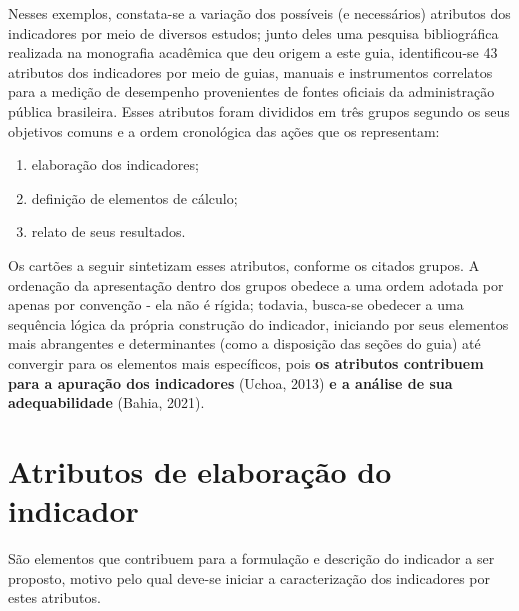 \documentclass[
  letterpaper,
  DIV=11,
  numbers=noendperiod]{scrreprt}
\begin{document}
Nesses exemplos, constata-se a variação dos possíveis (e necessários)
atributos dos indicadores por meio de diversos estudos; junto deles uma
pesquisa bibliográfica realizada na monografia acadêmica que deu origem
a este guia, identificou-se 43 atributos dos indicadores por meio de
guias, manuais e instrumentos correlatos para a medição de desempenho
provenientes de fontes oficiais da administração pública brasileira.
Esses atributos foram divididos em três grupos segundo os seus objetivos
comuns e a ordem cronológica das ações que os representam:

\begin{enumerate}
\def\labelenumi{\arabic{enumi}.}
\item
  elaboração dos indicadores;
\item
  definição de elementos de cálculo;
\item
  relato de seus resultados.
\end{enumerate}

Os cartões a seguir sintetizam esses atributos, conforme os citados
grupos. A ordenação da apresentação dentro dos grupos obedece a uma
ordem adotada por apenas por convenção - ela não é rígida; todavia,
busca-se obedecer a uma sequência lógica da própria construção do
indicador, iniciando por seus elementos mais abrangentes e determinantes
(como a disposição das seções do guia) até convergir para os elementos
mais específicos, pois \textbf{os atributos contribuem para a apuração
dos indicadores} (Uchoa, 2013) \textbf{e a análise de sua
adequabilidade} (Bahia, 2021).

\hypertarget{atributos-de-elaborauxe7uxe3o-do-indicador}{%
\section{Atributos de elaboração do
indicador}\label{atributos-de-elaborauxe7uxe3o-do-indicador}}

São elementos que contribuem para a formulação e descrição do indicador
a ser proposto, motivo pelo qual deve-se iniciar a caracterização dos
indicadores por estes atributos.
\end{document}

